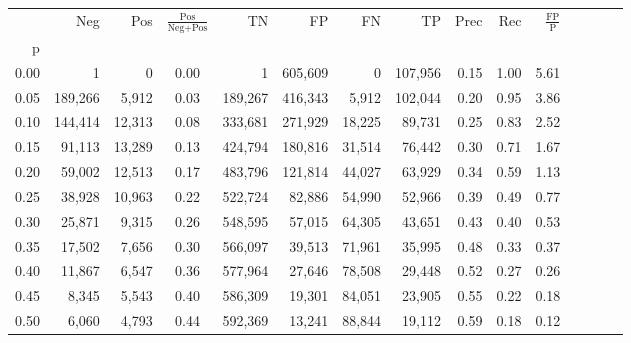 \begin{tabular}{rrrcrrrrrrrrrrr}
\toprule
{} &      Neg &     Pos & $\frac{\text{Pos}}{\text{Neg}+\text{Pos}}$ &       TN &       FP &       FN &       TP &  Prec &   Rec & $\frac{\text{FP}}{\text{P}}$ \\
p    &          &         &                                            &          &          &          &          &       &       &                              \\
\midrule
0.00 &        1 &       0 &                                       0.00 &        1 &  605,609 &        0 &  107,956 &  0.15 &  1.00 &                         5.61 \\
0.05 &  189,266 &   5,912 &                                       0.03 &  189,267 &  416,343 &    5,912 &  102,044 &  0.20 &  0.95 &                         3.86 \\
0.10 &  144,414 &  12,313 &                                       0.08 &  333,681 &  271,929 &   18,225 &   89,731 &  0.25 &  0.83 &                         2.52 \\
0.15 &   91,113 &  13,289 &                                       0.13 &  424,794 &  180,816 &   31,514 &   76,442 &  0.30 &  0.71 &                         1.67 \\
0.20 &   59,002 &  12,513 &                                       0.17 &  483,796 &  121,814 &   44,027 &   63,929 &  0.34 &  0.59 &                         1.13 \\
0.25 &   38,928 &  10,963 &                                       0.22 &  522,724 &   82,886 &   54,990 &   52,966 &  0.39 &  0.49 &                         0.77 \\
0.30 &   25,871 &   9,315 &                                       0.26 &  548,595 &   57,015 &   64,305 &   43,651 &  0.43 &  0.40 &                         0.53 \\
0.35 &   17,502 &   7,656 &                                       0.30 &  566,097 &   39,513 &   71,961 &   35,995 &  0.48 &  0.33 &                         0.37 \\
0.40 &   11,867 &   6,547 &                                       0.36 &  577,964 &   27,646 &   78,508 &   29,448 &  0.52 &  0.27 &                         0.26 \\
0.45 &    8,345 &   5,543 &                                       0.40 &  586,309 &   19,301 &   84,051 &   23,905 &  0.55 &  0.22 &                         0.18 \\
0.50 &    6,060 &   4,793 &                                       0.44 &  592,369 &   13,241 &   88,844 &   19,112 &  0.59 &  0.18 &                         0.12 \\

\end{tabular}
